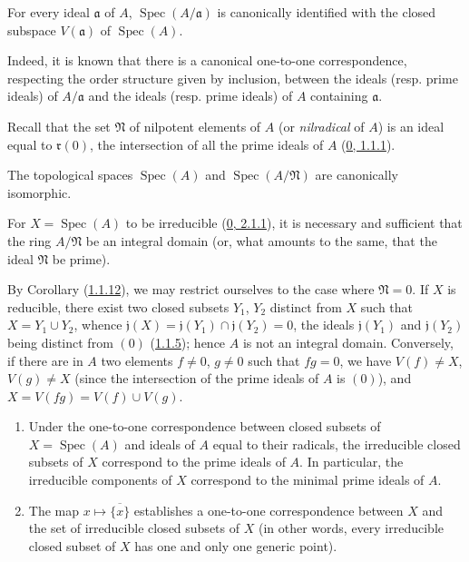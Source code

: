 \begin{proposition}[1.1.11]
\label{I.1.1.11}
For every ideal $\mathfrak{a}$ of $A$,
$\operatorname{Spec}(A/\mathfrak{a})$ is canonically identified with the
closed subspace $V(\mathfrak{a})$ of $\operatorname{Spec}(A)$.
\end{proposition}

Indeed, it is known that there is a canonical one-to-one correspondence,
respecting the order structure given by inclusion, between the ideals (resp.
prime ideals) of $A/\mathfrak{a}$ and the ideals (resp. prime ideals) of $A$
containing $\mathfrak{a}$.

Recall that the set $\mathfrak{N}$ of nilpotent elements of $A$ (or
\emph{nilradical} of $A$) is an ideal equal to $\mathfrak{r}(0)$, the
intersection of all the prime ideals of $A$
(\hyperref[0.1.1.1]{0, 1.1.1}).

\begin{corollary}[1.1.12]
\label{I.1.1.12}
The topological spaces $\operatorname{Spec}(A)$ and
$\operatorname{Spec}(A/\mathfrak{N})$ are canonically isomorphic.
\end{corollary}

\begin{proposition}[1.1.13]
\label{I.1.1.13}
For $X=\operatorname{Spec}(A)$ to be irreducible
(\hyperref[0.2.1.1]{0, 2.1.1}), it is necessary and sufficient that the
ring $A/\mathfrak{N}$ be an integral domain (or, what amounts to the same,
that the ideal $\mathfrak{N}$ be prime).
\end{proposition}

By Corollary (\hyperref[I.1.1.12]{1.1.12}), we may restrict ourselves to
the case where $\mathfrak{N}=0$. If $X$ is reducible, there exist two closed
subsets $Y_1$, $Y_2$ distinct from $X$ such that $X=Y_1\cup Y_2$, whence
$\mathfrak{j}(X)=\mathfrak{j}(Y_1)\cap\mathfrak{j}(Y_2)=0$, the ideals
$\mathfrak{j}(Y_1)$ and $\mathfrak{j}(Y_2)$ being distinct from $(0)$
(\hyperref[I.1.1.5]{1.1.5}); hence $A$ is not an integral domain.
Conversely, if there are in $A$ two elements $f\neq0$, $g\neq0$ such that
$fg=0$, we have $V(f)\neq X$, $V(g)\neq X$ (since the intersection of the
prime ideals of $A$ is $(0)$), and $X=V(fg)=V(f)\cup V(g)$.

\begin{corollary}[1.1.14]
\label{I.1.1.14}
\begin{enumerate}
  \item[\rm(i)] Under the one-to-one correspondence between closed subsets
  of $X=\operatorname{Spec}(A)$ and ideals of $A$ equal to their radicals,
  the irreducible closed subsets of $X$ correspond to the prime ideals of
  $A$. In particular, the irreducible components of $X$ correspond to the
  minimal prime ideals of $A$.
  \item[\rm(ii)] The map $x\mapsto\overline{\{x\}}$ establishes a
  one-to-one correspondence between $X$ and the set of irreducible closed
  subsets of $X$ (in other words, every irreducible closed subset of $X$
  has one and only one generic point).
\end{enumerate}
\end{corollary}

